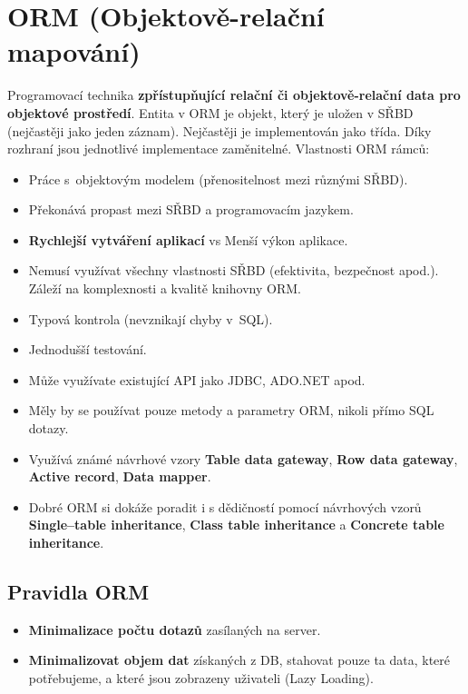 \section{ORM (Objektově-relační mapování)}
Programovací technika \textbf{zpřístupňující relační či objektově-relační data pro objektové prostředí}. Entita v ORM je objekt, který je uložen v SŘBD (nejčastěji jako jeden záznam). Nejčastěji je implementován jako třída. Díky rozhraní jsou jednotlivé implementace zaměnitelné. Vlastnosti ORM rámců:
\begin{itemize}
    \item Práce s objektovým modelem (přenositelnost mezi různými SŘBD).
    \item Překonává propast mezi SŘBD a programovacím jazykem.
    \item \textbf{Rychlejší vytváření aplikací} vs Menší výkon aplikace.
    \item Nemusí využívat všechny vlastnosti SŘBD (efektivita, bezpečnost apod.). Záleží na komplexnosti a kvalitě knihovny ORM.
    \item Typová kontrola (nevznikají chyby v SQL).
    \item Jednodušší testování.
    \item Může využívate existující API jako JDBC, ADO.NET apod.
    \item Měly by se používat pouze metody a parametry ORM, nikoli přímo SQL dotazy.
    \item Využívá známé návrhové vzory \textbf{Table data gateway}, \textbf{Row data gateway}, \textbf{Active record}, \textbf{Data mapper}.
    \item Dobré ORM si dokáže poradit i s dědičností pomocí návrhových vzorů \textbf{Single--table inheritance}, \textbf{Class table inheritance} a \textbf{Concrete table inheritance}.
\end{itemize}

\subsection{Pravidla ORM}
\begin{itemize}
    \item \textbf{Minimalizace počtu dotazů }zasílaných na server.
    \item \textbf{Minimalizovat objem dat} získaných z DB, stahovat pouze ta data, které potřebujeme, a které jsou zobrazeny uživateli (Lazy Loading).
\end{itemize}

